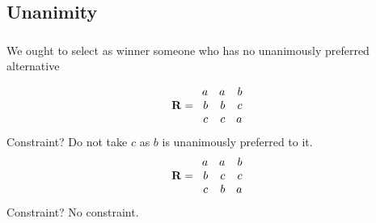 \documentclass[french, english]{beamer}
\begin{document}
\subsection{Unanimity}
\begin{frame}
	\frametitle{\subsecname}
	\begin{definition}[Unanimity]
		We ought to select as winner someone who has no unanimously preferred alternative
	\end{definition}
	\begin{equation}
		\mathbf{R} =
		\begin{array}{rrr}
			a	&	a	&	b\\
			b	&	b	&	c\\
			c	&	c	&	a
		\end{array}
	\end{equation}
	Constraint? \pause Do not take $c$ as $b$ is unanimously preferred to it.	\pause
	\begin{equation}
		\mathbf{R} =
		\begin{array}{rrr}
			a	&	a	&	b\\
			b	&	c	&	c\\
			c	&	b	&	a
		\end{array}
	\end{equation}
	Constraint? \pause No constraint.
\end{frame}
\end{document}
